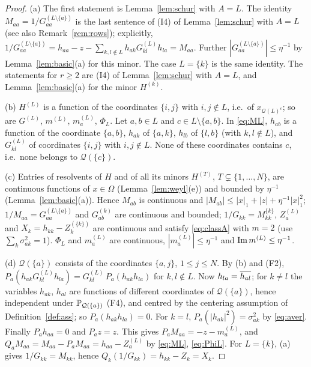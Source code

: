 \begin{proof}
(a) The first statement is Lemma~\ref{lem:schur} with $A=L$. The identity $M_{aa}=1/G^{(L\setminus\{a\})}_{aa}$ is the last sentence of (I4) of Lemma~\ref{lem:schur} with $A=L$
(see also Remark~\ref{rem:rows}); explicitly, $1/G^{(L\setminus\{a\})}_{aa}=h_{aa}-z-\sum_{k,l\notin L}h_{ak}G^{(L)}_{kl}h_{la}=M_{aa}$. Further $|G^{(L\setminus\{a\})}_{aa}|\le\eta^{-1}$ by Lemma~\ref{lem:basic}(a) for this minor. The case $L=\{k\}$ is the same identity.
The statements for $r\ge2$ are (I4) of Lemma~\ref{lem:schur} with $A=L$, and Lemma~\ref{lem:basic}(a) for the minor $H^{(k)}$.

(b) $H^{(L)}$ is a function of the coordinates $\{i,j\}$ with $i,j\notin L$, i.e.\ of $x_{\mathcal Q(L)^c}$; so are $G^{(L)}$, $m^{(L)}$, $m^{(L)}_a$, $\Phi_L$. Let $a,b\in L$ and $c\in L\setminus\{a,b\}$. In \eqref{eq:ML}, $h_{ab}$ is a function of the coordinate $\{a,b\}$,
$h_{ak}$ of $\{a,k\}$, $h_{lb}$ of $\{l,b\}$ (with $k,l\notin L$), and $G^{(L)}_{kl}$ of coordinates $\{i,j\}$ with $i,j\notin L$. None of these coordinates contains $c$, i.e.\ none belongs to $\mathcal Q(\{c\})$.

(c) Entries of resolvents of $H$ and of all its minors $H^{(T)}$, $T\subsetneq\{1,\dots,N\}$, are continuous functions of $x\in\Omega$ (Lemma~\ref{lem:weyl}(e)) and bounded by $\eta^{-1}$ (Lemma~\ref{lem:basic}(a)). Hence $M_{ab}$ is continuous and
$|M_{ab}|\le|x|_1+|z|+\eta^{-1}|x|_1^2$; $1/M_{aa}=G^{(L\setminus\{a\})}_{aa}$ and $G^{(k)}_{ab}$ are continuous and bounded; $1/G_{kk}=M^{\{k\}}_{kk}$, $Z^{(L)}_a$ and $X_k=h_{kk}-Z^{(\{k\})}_k$ are continuous and satisfy \eqref{eq:classA} with $m=2$
(use $\sum_k\sigma^2_{ak}=1$). $\Phi_L$ and $m_a^{(L)}$ are continuous, $|m^{(L)}_a|\le\eta^{-1}$ and $\operatorname{Im} m^{(L)}\le\eta^{-1}$.

(d) $\mathcal Q(\{a\})$ consists of the coordinates $\{a,j\}$, $1\le j\le N$. By (b) and (F2), $P_a(h_{ak}G^{(L)}_{kl}h_{la})=G^{(L)}_{kl}\,P_a(h_{ak}h_{la})$ for $k,l\notin L$. Now $h_{la}=\overline{h_{al}}$; for $k\ne l$ the variables $h_{ak}$, $h_{al}$ are functions of different coordinates of $\mathcal Q(\{a\})$, hence
independent under $\mathbb{P}_{\mathcal Q(\{a\})}$ (F4), and centred by the centering assumption of Definition~\ref{def:ass}; so $P_a(h_{ak}h_{la})=0$. For $k=l$, $P_a(|h_{ak}|^2)=\sigma_{ak}^2$ by \eqref{eq:aver}. Finally $P_ah_{aa}=0$ and $P_az=z$. This gives $P_aM_{aa}=-z-m_a^{(L)}$, and
$Q_aM_{aa}=M_{aa}-P_aM_{aa}=h_{aa}-Z_a^{(L)}$ by \eqref{eq:ML}, \eqref{eq:PhiL}. For $L=\{k\}$, (a) gives $1/G_{kk}=M_{kk}$, hence $Q_k(1/G_{kk})=h_{kk}-Z_k=X_k$.
\end{proof}

